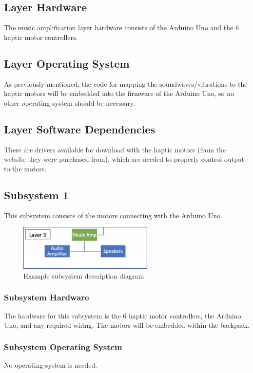 \subsection{Layer Hardware}
The music amplification layer hardware consists of the Arduino Uno and the 6 haptic motor controllers.

\subsection{Layer Operating System}
As previously mentioned, the code for mapping the soundwaves/vibrations to the haptic motors will be embedded into the firmware of the Arduino Uno, so no other operating system should be necessary.

\subsection{Layer Software Dependencies}
There are drivers available for download with the haptic motors (from the website they were purchased from), which are needed to properly control output to the motors.

\subsection{Subsystem 1}
This subsystem consists of the motors connecting with the Arduino Uno.

\begin{figure}[h!]
	\centering
 	\includegraphics[width=0.60\textwidth]{architectural design specification latex/images/subsystem3.png}
 \caption{Example subsystem description diagram}
\end{figure}

\subsubsection{Subsystem Hardware}
The hardware for this subsystem is the 6 haptic motor controllers, the Arduino Uno, and any required wiring. The motors will be embedded within the backpack.

\subsubsection{Subsystem Operating System}
No operating system is needed.

